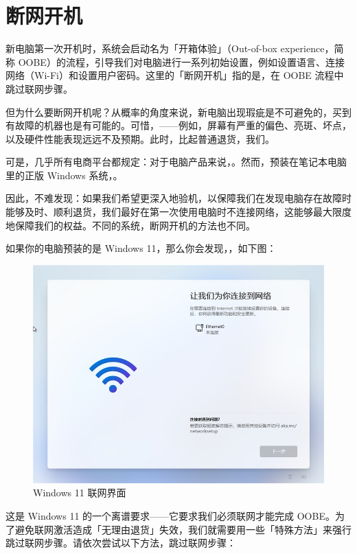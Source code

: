 \section{断网开机}

新电脑第一次开机时，系统会启动名为「开箱体验」（Out-of-box experience，简称 OOBE）的流程，引导我们对电脑进行一系列初始设置，例如设置语言、连接网络（Wi-Fi）和设置用户密码。这里的「断网开机」指的是，在 OOBE 流程中跳过联网步骤。

但为什么要断网开机呢？从概率的角度来说，新电脑出现瑕疵是不可避免的，买到有故障的机器也是有可能的。可惜，——例如，屏幕有严重的偏色、亮斑、坏点，以及硬件性能表现远远不及预期。此时，比起普通退货，我们。

可是，几乎所有电商平台都规定：对于电脑产品来说，。然而，预装在笔记本电脑里的正版 Windows 系统，。

因此，不难发现：如果我们希望更深入地验机，以保障我们在发现电脑存在故障时能够及时、顺利退货，我们最好在第一次使用电脑时不连接网络，这能够最大限度地保障我们的权益。不同的系统，断网开机的方法也不同。

如果你的电脑预装的是 Windows 11，那么你会发现，，如下图：

\begin{figure}[htb!]
  \centering
  \includegraphics[width=.65\textwidth]{assets/appendix/Windows_11_no_skip_internet.png}
  \caption{Windows 11 联网界面}
  \label{fig:Windows_11_no_skip_internet}
\end{figure}

这是 Windows 11 的一个离谱要求——它要求我们必须联网才能完成 OOBE。为了避免联网激活造成「无理由退货」失效，我们就需要用一些「特殊方法」来强行跳过联网步骤。请依次尝试以下方法，跳过联网步骤：

